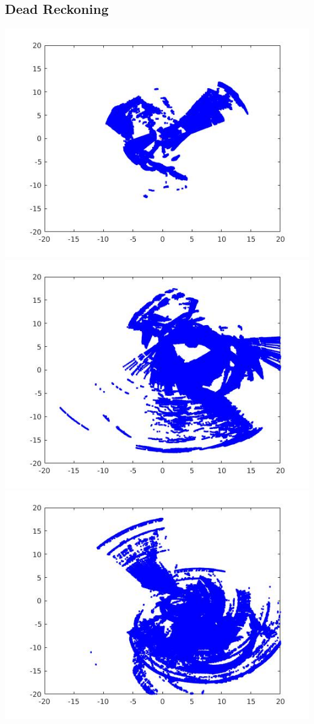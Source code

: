 \documentclass[english]{article}
\begin{document}
\subsection*{Dead Reckoning}
\includegraphics[scale=0.8]{map0dead.jpg}\\
\includegraphics[scale=0.8]{map1dead.jpg}\\
\includegraphics[scale=0.8]{map2dead.jpg}\\
\end{document}
